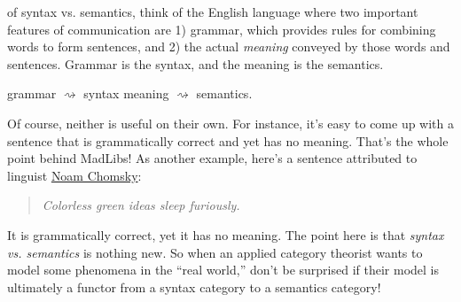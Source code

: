 \documentclass{tufte-handout-tai}
\newcommand{\cat}[1]{{\normalfont\textsf{#1}}}
\theoremstyle{plain}
\theoremstyle{definition}
\theoremstyle{remark}
\begin{document}
 of syntax vs. semantics, think of the English language where two important features of communication are 1) grammar, which provides rules for combining words to form sentences, and 2) the actual \textit{meaning} conveyed by those words and sentences.
Grammar is the syntax, and the meaning is the semantics.
	\begin{center}
		grammar $\rightsquigarrow$ \cat{syntax} 
		\qquad \qquad meaning  $\rightsquigarrow$ \cat{semantics}.
	\end{center}
Of course, neither is useful on their own. For instance, it's easy to come up with a sentence that is grammatically correct and yet has no meaning. That's the whole point behind MadLibs!
As another example, here's a sentence attributed to linguist \href{https://en.wikipedia.org/wiki/Colorless_green_ideas_sleep_furiously}{Noam Chomsky}:
\begin{quote}
\textit{Colorless green ideas sleep furiously.}
\end{quote}
It is grammatically correct, yet it has no meaning. The point here is that \textit{syntax vs. semantics} is nothing new. So when an applied category theorist wants to model some phenomena in the ``real world,'' don't be surprised if their model is ultimately a functor from a syntax category to a semantics category! 
\end{document}
